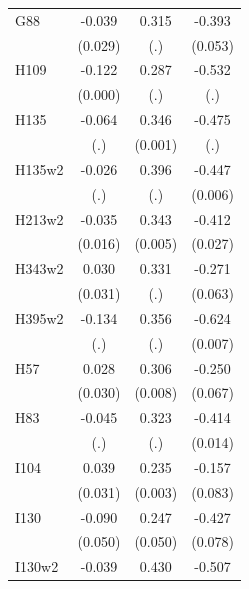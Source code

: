 \begin{table}[htbp]
\begin{tabular}{l*{3}{c}}
G88             &   -0.039         &    0.315         &   -0.393\sym{***}\\
                &  (0.029)         &      (.)         &  (0.053)         \\
H109            &   -0.122\sym{***}&    0.287         &   -0.532         \\
                &  (0.000)         &      (.)         &      (.)         \\
H135            &   -0.064         &    0.346\sym{***}&   -0.475         \\
                &      (.)         &  (0.001)         &      (.)         \\
H135w2          &   -0.026         &    0.396         &   -0.447\sym{***}\\
                &      (.)         &      (.)         &  (0.006)         \\
H213w2          &   -0.035\sym{**} &    0.343\sym{***}&   -0.412\sym{***}\\
                &  (0.016)         &  (0.005)         &  (0.027)         \\
H343w2          &    0.030         &    0.331         &   -0.271\sym{***}\\
                &  (0.031)         &      (.)         &  (0.063)         \\
H395w2          &   -0.134         &    0.356         &   -0.624\sym{***}\\
                &      (.)         &      (.)         &  (0.007)         \\
H57             &    0.028         &    0.306\sym{***}&   -0.250\sym{***}\\
                &  (0.030)         &  (0.008)         &  (0.067)         \\
H83             &   -0.045         &    0.323         &   -0.414\sym{***}\\
                &      (.)         &      (.)         &  (0.014)         \\
I104            &    0.039         &    0.235\sym{***}&   -0.157\sym{*}  \\
                &  (0.031)         &  (0.003)         &  (0.083)         \\
I130            &   -0.090\sym{*}  &    0.247\sym{***}&   -0.427\sym{***}\\
                &  (0.050)         &  (0.050)         &  (0.078)         \\
I130w2          &   -0.039\sym{***}&    0.430         &   -0.507         \\

\end{tabular}
\end{table}
